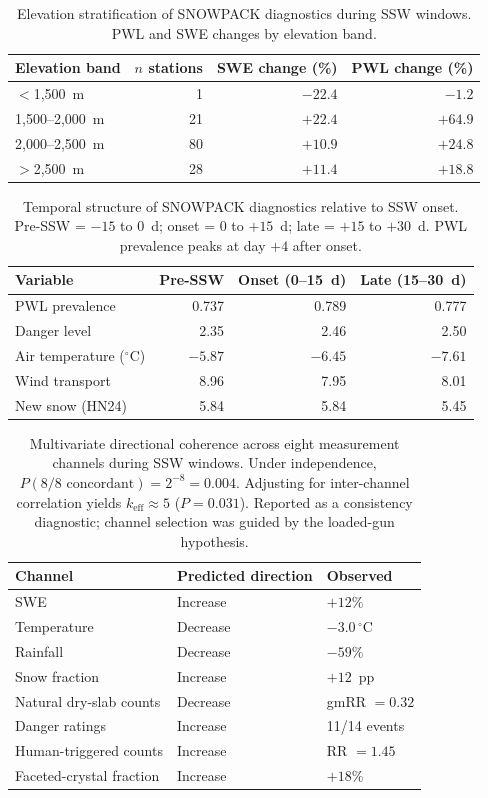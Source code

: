 \documentclass[11pt,letterpaper]{article}
\begin{document}
\begin{table}[htbp]
\centering
\caption{Elevation stratification of SNOWPACK diagnostics during SSW windows. PWL and SWE changes by elevation band.}
\label{tab:elev_strat}
\begin{tabular}{lrrr}
\toprule
Elevation band & $n$ stations & SWE change (\%) & PWL change (\%) \\
\midrule
$<$1,500~m & 1 & $-22.4$ & $-1.2$ \\
1,500--2,000~m & 21 & $+22.4$ & $+64.9$ \\
2,000--2,500~m & 80 & $+10.9$ & $+24.8$ \\
$>$2,500~m & 28 & $+11.4$ & $+18.8$ \\
\bottomrule
\end{tabular}
\end{table}

\begin{table}[htbp]
\centering
\caption{Temporal structure of SNOWPACK diagnostics relative to SSW onset. Pre-SSW = $-15$ to $0$~d; onset = 0 to $+15$~d; late = $+15$ to $+30$~d. PWL prevalence peaks at day $+4$ after onset.}
\label{tab:temporal_mechanism}
\begin{tabular}{lrrr}
\toprule
Variable & Pre-SSW & Onset (0--15~d) & Late (15--30~d) \\
\midrule
PWL prevalence & 0.737 & 0.789 & 0.777 \\
Danger level & 2.35 & 2.46 & 2.50 \\
Air temperature ($^\circ$C) & $-5.87$ & $-6.45$ & $-7.61$ \\
Wind transport & 8.96 & 7.95 & 8.01 \\
New snow (HN24) & 5.84 & 5.84 & 5.45 \\
\bottomrule
\end{tabular}
\end{table}

\begin{table}[htbp]
\centering
\caption{Multivariate directional coherence across eight measurement channels during SSW windows. Under independence, $P(\text{8/8 concordant}) = 2^{-8} = 0.004$. Adjusting for inter-channel correlation yields $k_{\mathrm{eff}} \approx 5$ ($P = 0.031$). Reported as a consistency diagnostic; channel selection was guided by the loaded-gun hypothesis.}
\label{tab:combinatorial}
\begin{tabular}{lll}
\toprule
Channel & Predicted direction & Observed \\
\midrule
SWE & Increase & $+12\%$ \\
Temperature & Decrease & $-3.0\,^\circ$C \\
Rainfall & Decrease & $-59\%$ \\
Snow fraction & Increase & $+12$~pp \\
Natural dry-slab counts & Decrease & gmRR $= 0.32$ \\
Danger ratings & Increase & 11/14 events \\
Human-triggered counts & Increase & RR $= 1.45$ \\
Faceted-crystal fraction & Increase & $+18\%$ \\
\bottomrule
\end{tabular}
\end{table}
\end{document}
